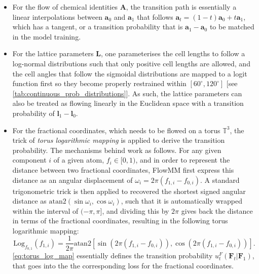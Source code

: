 \begin{myquote}
\begin{itemize}
    \item For the flow of chemical identities $\bm{A}$, the transition path is essentially a linear interpolations between $\bm{a}_0$ and $\bm{a}_1$ that follows $\bm{a}_t=(1-t)\bm{a}_0+t\bm{a}_1$, which has a tangent, or a transition probability that is $\bm{a}_1-\bm{a}_0$ to be matched in the model training.
    \item For the lattice parameters $\bm{L}$, one parameterises the cell lengths to follow a log-normal distributions such that only positive cell lengths are allowed, and the cell angles that follow the sigmoidal distributions are mapped to a logit function first so they become properly restrained within $[60^\circ,120^\circ]$ [see \cref{tab:continuous_prob_distributions}]. As such, the lattice parameters can also be treated as flowing linearly in the Euclidean space with a transition probability of $\bm{l}_1-\bm{l}_0$.
    \item For the fractional coordinates, which needs to be flowed on a torus $\mathbb{T}^3$, the trick of \emph{torus logarithmic mapping} is applied to derive the transition probability. The mechanisms behind work as follows. For any given component $i$ of a given atom, $f_i\in[0,1)$, and in order to represent the distance between two fractional coordinates, FlowMM first express this distance as an angular displacement of $\omega_i=2\pi(f_{1,i}-f_{0,i})$. A standard trigonometric trick is then applied to recovered the shortest signed angular distance as $\mathrm{atan2}(\sin\omega_i,\cos\omega_i)$, such that it is automatically wrapped within the interval of $(-\pi,\pi]$, and dividing this by $2\pi$ gives back the distance in terms of the fractional coordinates, resulting in the following torus logarithmic mapping:
    \begin{equation}
        \label{eq:torus_log_map}
        \mathrm{Log}_{f_{0,1}}(f_{1,i})=\frac{1}{2\pi}\mathrm{atan2}\left[ \sin\left( 2\pi(f_{1,i}-f_{0,i})  \right) , \cos\left( 2\pi(f_{1,i}-f_{0,i})  \right) \right].
    \end{equation}
    \cref{eq:torus_log_map} essentially defines the transition probability $u_t^F(\bm{F}_t|\bm{F}_1)$, that goes into the the corresponding loss for the fractional coordinates. 
\end{itemize}
\end{myquote}

